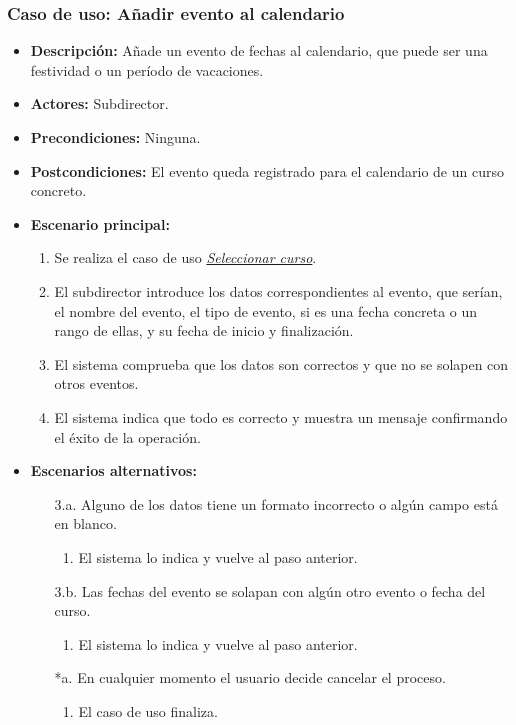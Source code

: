 \documentclass{book}
\begin{document}
\subsubsection*{Caso de uso: Añadir evento al calendario}
\begin{itemize}
\item{\bf Descripción:} Añade un evento de fechas al calendario, que puede ser una festividad o un período de vacaciones.
\item{\bf Actores:} Subdirector.
\item{\bf Precondiciones:} Ninguna.
\item{\bf Postcondiciones:} El evento queda registrado para el calendario de un curso concreto.
\item{\bf Escenario principal:}
	\begin{enumerate}
	\item Se realiza el caso de uso {\em \hyperref[select_curso]{Seleccionar curso}}.
	\item El subdirector introduce los datos correspondientes al evento, que serían, el nombre del evento, el tipo de evento, si es una fecha concreta o un rango de ellas, y su fecha de inicio y finalización.
	\item El sistema comprueba que los datos son correctos y que no se solapen con otros eventos.
	\item El sistema indica que todo es correcto y muestra un mensaje confirmando el éxito de la operación.
	\end{enumerate}
\item{\bf Escenarios alternativos:}
	\begin{itemize}
		\item[3.a.] Alguno de los datos tiene un formato incorrecto o algún campo está en blanco.
		\begin{enumerate}
			\item El sistema lo indica y vuelve al paso anterior.
		\end{enumerate}
		\item[3.b.] Las fechas del evento se solapan con algún otro evento o fecha del curso.
		\begin{enumerate}
			\item El sistema lo indica y vuelve al paso anterior.
		\end{enumerate}
		\item[*a.] En cualquier momento el usuario decide cancelar el proceso.
		\begin{enumerate}
		\item El caso de uso finaliza.
		\end{enumerate}
	\end{itemize}
\end{itemize}
\end{document}
